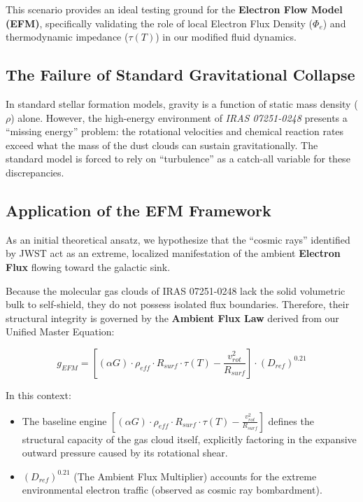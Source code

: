 \documentclass[11pt, a4paper]{article}
\begin{document}
This scenario provides an ideal testing ground for the \textbf{Electron Flow Model (EFM)}, specifically validating the role of local Electron Flux Density ($\Phi_e$) and thermodynamic impedance ($\tau(T)$) in our modified fluid dynamics.

\subsection{The Failure of Standard Gravitational Collapse}
In standard stellar formation models, gravity is a function of static mass density ($\rho$) alone. However, the high-energy environment of \textit{IRAS 07251-0248} presents a ``missing energy'' problem: the rotational velocities and chemical reaction rates exceed what the mass of the dust clouds can sustain gravitationally. The standard model is forced to rely on ``turbulence'' as a catch-all variable for these discrepancies.

\subsection{Application of the EFM Framework}
  As an initial theoretical ansatz, we hypothesize that the ``cosmic rays'' identified by JWST act as an extreme, localized manifestation of the ambient \textbf{Electron Flux} flowing toward the galactic sink.

  Because the molecular gas clouds of IRAS 07251-0248 lack the solid volumetric bulk to self-shield, they do not possess isolated flux boundaries. Therefore, their structural integrity is governed by the \textbf{Ambient Flux Law} derived from our Unified Master Equation:

  \begin{equation}
    g_{EFM} = \left[ (\alpha G) \cdot \rho_{eff} \cdot R_{surf} \cdot \tau(T) - \frac{v_{rot}^2}{R_{surf}} \right] \cdot (D_{ref})^{0.21}
  \end{equation}

  In this context:
  \begin{itemize}
    \item The baseline engine $\left[ (\alpha G) \cdot \rho_{eff} \cdot R_{surf} \cdot \tau(T) - \frac{v_{rot}^2}{R_{surf}} \right]$ defines the structural capacity of the gas cloud itself, explicitly factoring in the expansive outward pressure caused by its rotational shear.
    \item $(D_{ref})^{0.21}$ (The Ambient Flux Multiplier) accounts for the extreme environmental electron traffic (observed as cosmic ray bombardment).
  \end{itemize}
\end{document}
